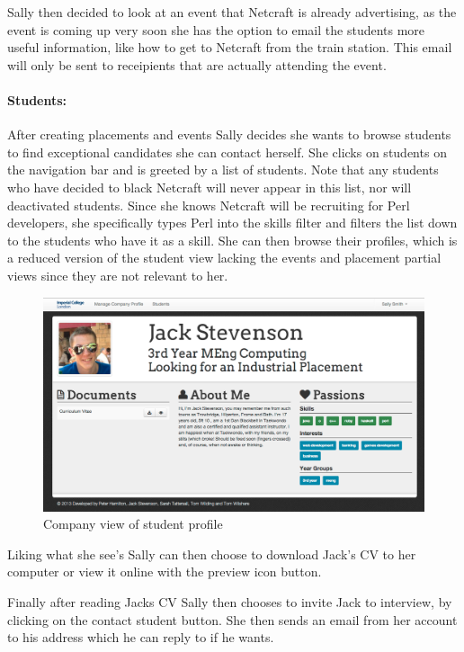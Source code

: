     Sally then decided to look at an event that Netcraft is already advertising, as the event is coming up very soon she has the option to email the students more useful information, like how to get to Netcraft from the train station.
    This email will only be sent to receipients that are actually attending the event.
  
  \paragraph{Students:}
    After creating placements and events Sally decides she wants to browse students to find exceptional candidates she can contact herself. She clicks on students on the navigation bar and is greeted by a list of students. Note that any students who have decided to black Netcraft will never appear in this list, nor will deactivated students.
    Since she knows Netcraft will be recruiting for Perl developers, she specifically types Perl into the skills filter
    and filters the list down to the students who have it as a skill.
    She can then browse their profiles, which is a reduced version of the student view lacking the events and placement partial views since they are not relevant to her.

    \begin{figure}[H]\centering
    \includegraphics[scale=0.3]{images/user_experiences/company/jack_profile}
    \caption{Company view of student profile}
    \end{figure}

    Liking what she see's Sally can then choose to download Jack's CV to her computer or view it online with the preview icon button. 

    Finally after reading Jacks CV Sally then chooses to invite Jack to interview, by clicking on the contact student button. She then sends an email from her account to his address which he can reply to if he wants. 

